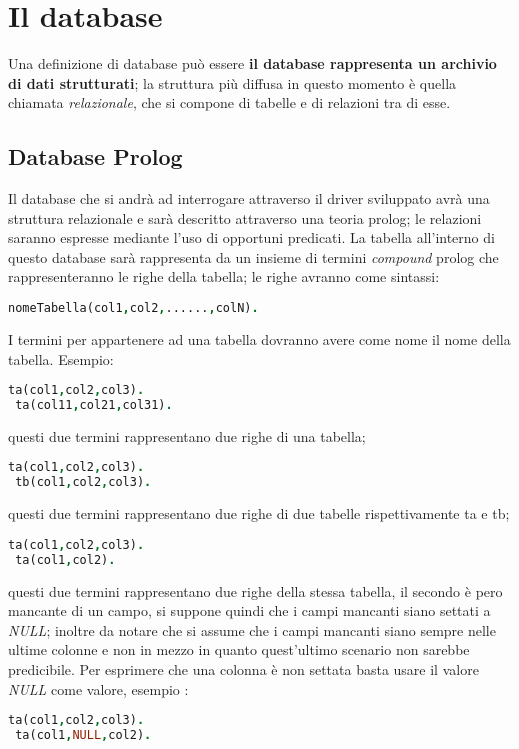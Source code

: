 \section{Il database}

Una definizione di database può essere {\bf il database rappresenta un archivio di dati strutturati}; la struttura più diffusa in questo momento è quella chiamata \emph{relazionale}, che si compone di tabelle e di relazioni tra di esse.

\subsection{Database Prolog}
Il database che si andrà ad interrogare attraverso il driver sviluppato avrà una struttura relazionale e sarà descritto attraverso una teoria prolog; le relazioni saranno espresse mediante l'uso di opportuni predicati. La tabella all'interno di questo database sarà rappresenta da un insieme di termini \emph{compound} prolog che rappresenteranno le righe della tabella; le righe avranno come sintassi:  
\begin{lstlisting}[language=Prolog]
 nomeTabella(col1,col2,......,colN).
\end{lstlisting}
I termini per appartenere ad una tabella dovranno avere come nome il nome della tabella. Esempio:
\begin{lstlisting}[language=Prolog]
 ta(col1,col2,col3).
 ta(col11,col21,col31).
\end{lstlisting}
questi due termini rappresentano due righe di una tabella;
\begin{lstlisting}[language=Prolog]
 ta(col1,col2,col3).
 tb(col1,col2,col3).
\end{lstlisting}
questi due termini rappresentano due righe di due tabelle rispettivamente ta e tb;
\begin{lstlisting}[language=Prolog]
 ta(col1,col2,col3).
 ta(col1,col2).
\end{lstlisting}
questi due termini rappresentano due righe della stessa tabella, il secondo è pero mancante di un campo, si suppone quindi che i campi mancanti siano settati a \emph{NULL};  inoltre da notare che si assume che i campi mancanti siano sempre nelle ultime colonne e non in mezzo in quanto quest'ultimo scenario non sarebbe predicibile. Per esprimere che una colonna è non settata basta usare il valore \emph{NULL} come valore, esempio : 
\begin{lstlisting}[language=Prolog]
 ta(col1,col2,col3).
 ta(col1,NULL,col2).
\end{lstlisting} 

